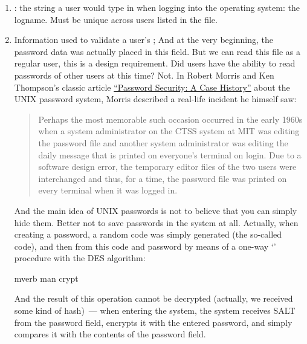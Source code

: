 \begin{enumerate}
\item {}: the string a user would type in when logging into
      the operating system: the logname. Must be unique across users listed
      in the file.
\item Information used to validate a user's ; And at the very
      beginning, the password data was actually placed in this field.
      But we can read this file as a regular user, this is a design requirement.
      Did users have the ability to read passwords of other users at this time?
      Not. In Robert Morris and Ken Thompson's classic article
      \href{https://rist.tech.cornell.edu/6431papers/MorrisThompson1979.pdf}%
      {``Password Security: A Case History''}
      about the UNIX password system, Morris described a real-life incident
      he himself saw:
      \begin{quote}
      Perhaps the most memorable such occasion occurred in the early 1960s when
      a system administrator on the CTSS system at MIT was editing the password
      file and another system administrator was editing the daily message that
      is printed on everyone’s terminal on login. Due to a software design
      error, the temporary editor files of the two users were interchanged and
      thus, for a time, the password file was printed on every terminal when it
      was logged in.
      \end{quote}
      And the main idea of UNIX passwords is not to believe that you can simply
      hide them. Better not to save passwords in the system at all. Actually,
      when creating a password, a random code was simply generated
      (the so-called  code), and then from this code and password
      by means of a one-way `' procedure with the DES algorithm:
\begin{code}{mverb}
man crypt
\end{code}
      And the result of this operation cannot be decrypted (actually, we
      received some kind of hash)~--- when entering the system, the system
      receives SALT from the password field, encrypts it with the entered
      password, and simply compares it with the contents of the password field.


\end{enumerate}
